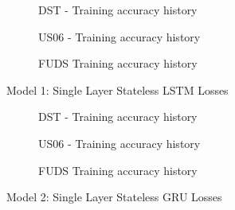 \begin{figure}[htbp]
    \centering
    \begin{subfigure}[b]{0.95\textwidth}
        \centering
        
        \caption{DST - Training accuracy history}
    \end{subfigure}
    \hfill
    \begin{subfigure}[b]{0.95\textwidth}
        \centering
        
        \caption{US06 - Training accuracy history}
    \end{subfigure}
    \hfill
    \begin{subfigure}[b]{0.95\textwidth}
        \centering
        
        \caption{FUDS Training accuracy history}
    \end{subfigure}    
    \caption{Model 1: Single Layer Stateless LSTM Losses}
    \label{fig:Model-1losses}
\end{figure}
\begin{figure}[htbp]
    \centering
    \begin{subfigure}[b]{0.95\textwidth}
        \centering
        
        \caption{DST - Training accuracy history}
    \end{subfigure}
    \hfill
    \begin{subfigure}[b]{0.95\textwidth}
        \centering
        
        \caption{US06 - Training accuracy history}
    \end{subfigure}
    \hfill
    \begin{subfigure}[b]{0.95\textwidth}
        \centering
        
        \caption{FUDS Training accuracy history}
    \end{subfigure}    
    \caption{Model 2: Single Layer Stateless GRU Losses}
    \label{fig:Model-2losses}
\end{figure}
